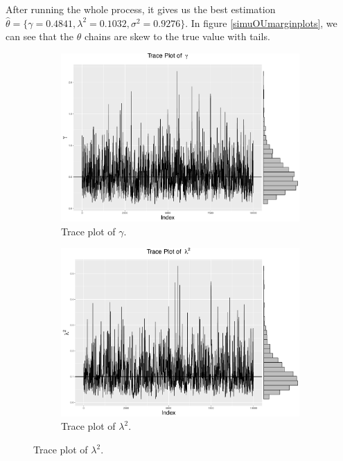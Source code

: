 After running the whole process, it gives us the best estimation $\hat{\theta} = \{\gamma=0.4841, \lambda^2=0.1032, \sigma^2=0.9276\}$. In figure \ref{simuOUmarginplots}, we can see that the $\theta$ chains are skew to the true value with tails.
\begin{figure}[h]
\centering
 \begin{subfigure}[b]{0.3\textwidth}
     \includegraphics[width=\textwidth]{Chapters/05MCMCOU/plots/simudataOUtracegam.pdf}
     \caption{Trace plot of $\gamma$.}
\end{subfigure}
\begin{subfigure}[b]{0.3\textwidth}
    \includegraphics[width=\textwidth]{Chapters/05MCMCOU/plots/simudataOUtracelab2.pdf}
     \caption{Trace plot of $\lambda^2$.}
\end{subfigure}

\end{figure}

